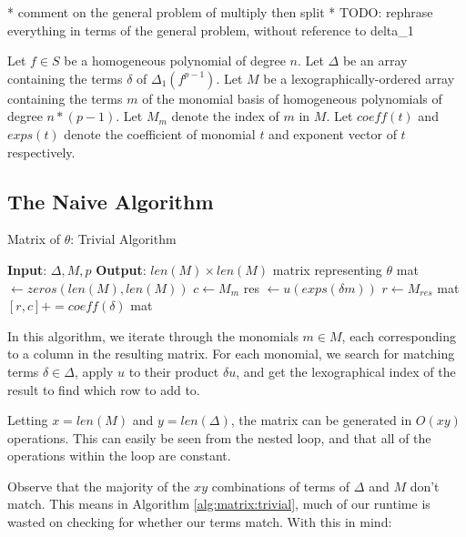 
* comment on the general problem of multiply then split
* TODO: rephrase everything in terms of the general problem, without 
reference to delta_1

\begin{cxt}
	Let \(f \in S\) be a homogeneous
	polynomial of degree \(n\).
	Let \(\Delta\) be an array containing the 
	terms $\delta$ of \(\Delta_{1}(f^{p-1})\).
	Let \(M\) be a lexographically-ordered array containing the terms $m$ of the monomial basis of
	homogeneous polynomials of degree
	\(n*(p-1)\). Let $M_m$ denote the index of $m$ in $M$. Let $coeff(t)$ and $exps(t)$ denote the coefficient of monomial $t$ and exponent vector of $t$ respectively.
\end{cxt}

\subsection{The Naive Algorithm}

\begin{algorithm}[H]
    \caption{Matrix of $\theta$: Trivial Algorithm}
    \label{alg:matrix:trivial}
    \begin{algorithmic}[1]
    \State \textbf{Input}: $\Delta, M, p$
    \State \textbf{Output}: $len(M) \times len(M)$ matrix representing $\theta$
    \State mat $\gets zeros(len(M), len(M))$
        \State $c \gets M_{m}$
        \For{$\delta \in \Delta$}
             
                \State res $\gets u(exps(\delta m))$
                \State $r \gets M_{res}$
                \State mat $[r, c] += coeff(\delta)$
            \EndIf
        \EndFor
    \EndFor
    \State \Return mat
    \end{algorithmic}
\end{algorithm}

In this algorithm, we iterate through the monomials $m \in M$, each corresponding to a column in the
resulting matrix. For each monomial, we search for matching terms $\delta \in \Delta$, apply $u$ to their product $\delta u$, and 
get the lexographical index of the result to find which row to add to.

Letting $x = len(M)$ and $y = len(\Delta)$, the matrix can be generated in $O(xy)$ operations. This can easily be
seen from the nested loop, and that all of the operations within the loop are constant.

Observe that the majority of the $xy$ combinations of terms of $\Delta$ and $M$ don't match. This means in
Algorithm \ref{alg:matrix:trivial}, much of our runtime is wasted on checking for whether our terms match. With this in mind:

